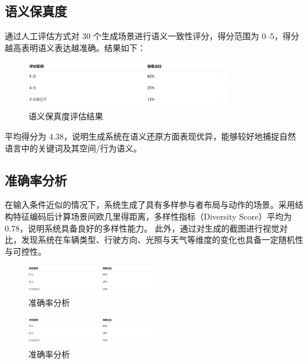 \subsection{语义保真度}
通过人工评估方式对 30 个生成场景进行语义一致性评分，得分范围为 0–5，得分越高表明语义表达越准确。结果如下：
\begin{figure}[h]
	\centering
	\includegraphics[width=0.8\textwidth]{"images/picture1.pdf"}
	\caption{语义保真度评估结果}
	\label{fig:semantic_fidelity}
\end{figure}

平均得分为 4.38，说明生成系统在语义还原方面表现优异，能够较好地捕捉自然语言中的关键词及其空间/行为语义。

\subsection{准确率分析}
在输入条件近似的情况下，系统生成了具有多样参与者布局与动作的场景。采用结构特征编码后计算场景间欧几里得距离，多样性指标（Diversity Score）平均为 0.78，说明系统具备良好的多样性能力。
此外，通过对生成的截图进行视觉对比，发现系统在车辆类型、行驶方向、光照与天气等维度的变化也具备一定随机性与可控性。
\begin{figure}[h]
	\centering
	\includegraphics[width=0.5\textwidth]{images/picture1.pdf}
	\caption{准确率分析}
	\label{fig:accuracy_analysis}
\end{figure}

\begin{figure}[h]
	\centering
	\includegraphics[width=0.5\textwidth]{images/picture1.pdf}
	\caption{准确率分析}
	\label{fig:accuracy_analysis}
\end{figure}

